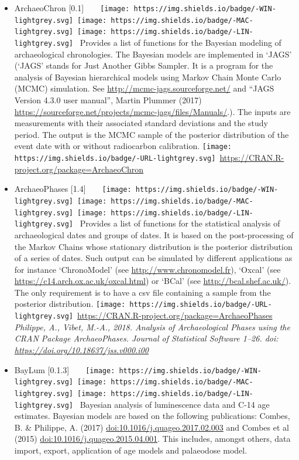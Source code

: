 \documentclass[]{article}
\providecommand{\tightlist}{%
  \setlength{\itemsep}{0pt}\setlength{\parskip}{0pt}}
\begin{document}
\begin{itemize}
\tightlist
\item
  ArchaeoChron {[}0.1{]}~~~~\texttt{[image: https://img.shields.io/badge/-WIN-lightgrey.svg]}~\texttt{[image: https://img.shields.io/badge/-MAC-lightgrey.svg]}~\texttt{[image: https://img.shields.io/badge/-LIN-lightgrey.svg]}~
  Provides a list of functions for the Bayesian modeling of archaeological chronologies. The Bayesian models are implemented in `JAGS' (`JAGS' stands for Just Another Gibbs Sampler. It is a program for the analysis of Bayesian hierarchical models using Markov Chain Monte Carlo (MCMC) simulation. See \url{http://mcmc-jags.sourceforge.net/} and ``JAGS Version 4.3.0 user manual'', Martin Plummer (2017) \url{https://sourceforge.net/projects/mcmc-jags/files/Manuals/}.). The inputs are measurements with their associated standard deviations and the study period. The output is the MCMC sample of the posterior distribution of the event date with or without radiocarbon calibration.
  \texttt{[image: https://img.shields.io/badge/-URL-lightgrey.svg]}~\url{https://CRAN.R-project.org/package=ArchaeoChron}
\item
  ArchaeoPhases {[}1.4{]}~~~~\texttt{[image: https://img.shields.io/badge/-WIN-lightgrey.svg]}~\texttt{[image: https://img.shields.io/badge/-MAC-lightgrey.svg]}~\texttt{[image: https://img.shields.io/badge/-LIN-lightgrey.svg]}~
  Provides a list of functions for the statistical analysis of archaeological dates and groups of dates. It is based on the post-processing of the Markov Chains whose stationary distribution is the posterior distribution of a series of dates. Such output can be simulated by different applications as for instance `ChronoModel' (see \url{http://www.chronomodel.fr}), `Oxcal' (see \url{https://c14.arch.ox.ac.uk/oxcal.html}) or `BCal' (see \url{http://bcal.shef.ac.uk/}). The only requirement is to have a csv file containing a sample from the posterior distribution.
  \texttt{[image: https://img.shields.io/badge/-URL-lightgrey.svg]}~\url{https://CRAN.R-project.org/package=ArchaeoPhases}
  \emph{Philippe, A., Vibet, M.-A., 2018. Analysis of Archaeological Phases using the CRAN Package ArchaeoPhases. Journal of Statistical Software 1--26. doi: \url{https://doi.org/10.18637/jss.v000.i00}}
\item
  BayLum {[}0.1.3{]}~~~~\texttt{[image: https://img.shields.io/badge/-WIN-lightgrey.svg]}~\texttt{[image: https://img.shields.io/badge/-MAC-lightgrey.svg]}~\texttt{[image: https://img.shields.io/badge/-LIN-lightgrey.svg]}~
  Bayesian analysis of luminescence data and C-14 age estimates. Bayesian models are based on the following publications: Combes, B. \& Philippe, A. (2017) \url{doi:10.1016/j.quageo.2017.02.003} and Combes et al (2015) \url{doi:10.1016/j.quageo.2015.04.001}. This includes, amongst others, data import, export, application of age models and palaeodose model.

\end{itemize}
\end{document}

